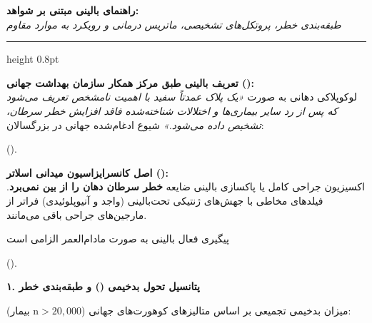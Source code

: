 \documentclass[a4paper]{article}
\newcommand{\hlg}[1]{\colorbox{hlgray}{\strut #1}}
\newcommand{\hly}[1]{\colorbox{hlyellow}{\strut #1}}
\begin{document}

\begin{center}
{\Large\bfseries راهنمای بالینی مبتنی بر شواهد: }\\[2pt]
{\small\itshape طبقه‌بندی خطر، پروتکل‌های تشخیصی، ماتریس درمانی و رویکرد به موارد مقاوم}
\end{center}
\vspace{-4pt}
\hrule height 0.8pt
\vspace{4pt}

\textbf{تعریف بالینی طبق مرکز همکار سازمان بهداشت جهانی ():}\\
لوکوپلاکی دهانی به صورت \textit{«یک پلاک عمدتاً سفید با اهمیت نامشخص تعریف می‌شود که پس از رد سایر بیماری‌ها و اختلالات شناخته‌شده فاقد افزایش خطر سرطان، تشخیص داده می‌شود.»} شیوع ادغام‌شده جهانی در بزرگسالان: \hlg{} ().

\textbf{اصل کانسرایزاسیون میدانی اسلاتر ():}\\
اکسیزیون جراحی کامل یا پاکسازی بالینی ضایعه \textbf{خطر سرطان دهان را از بین نمی‌برد}. فیلدهای مخاطی با جهش‌های ژنتیکی تحت‌بالینی (واجد  و آنیوپلوئیدی) فراتر از مارجین‌های جراحی باقی می‌مانند. \hly{پیگیری فعال بالینی به صورت مادام‌العمر الزامی است} (\href{https://pubmed.ncbi.nlm.nih.gov/27471822/}{}).

\vspace{2pt}
{\large\bfseries ۱. پتانسیل تحول بدخیمی () و طبقه‌بندی خطر}
\vspace{1pt}

میزان بدخیمی تجمیعی بر اساس متالیزهای کوهورت‌های جهانی ($\text{n}>20,000$ بیمار):
\end{document}
